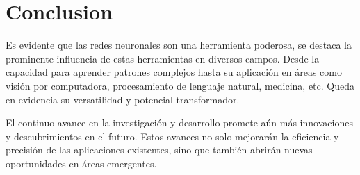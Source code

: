 \documentclass[runningheads]{llncs} %
\begin{document}
\newpage
\section{Conclusion}
Es evidente que las redes neuronales son una herramienta poderosa, se destaca 
la prominente influencia de estas herramientas en diversos campos. 
Desde la capacidad para aprender patrones complejos  hasta su aplicación en áreas 
como visión por computadora, procesamiento de lenguaje natural, medicina, etc.
Queda en evidencia su versatilidad y potencial transformador.

El continuo avance en la investigación y desarrollo promete aún más innovaciones y 
descubrimientos en el futuro. Estos avances no solo mejorarán la eficiencia y precisión 
de las aplicaciones existentes, sino que también abrirán nuevas oportunidades 
en áreas emergentes.

\printbibliography
\end{document}
